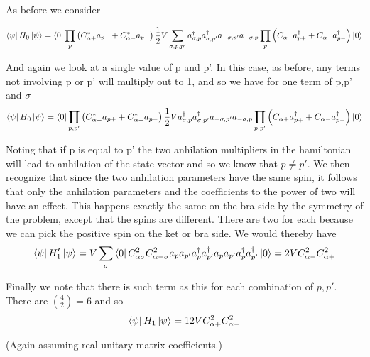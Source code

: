 \documentclass[11pt]{article} %
\begin{document}
As before we consider

\begin{equation} \bra{\psi} H_0 \ket{\psi}=\bra{0}\prod_p \left(C_{\alpha+}^*a_{p+}+C_{\alpha -}^*a_{p -} \right)\frac{1}{2}V \sum_{\sigma,p,p'} a_{\sigma,p}^\dagger a_{\sigma,p'}^\dagger a_{-\sigma,p'}a_{-\sigma,p}\prod_p \left(C_{\alpha+}a_{p+}^\dagger+C_{\alpha -}a_{p -}^\dagger \right) \ket{0}\end{equation}

And again we look at a single value of p and p'. In this case, as before, any terms not involving p or p' will multiply out to 1, and so we have for one term of p,p' and $\sigma$\\

\begin{equation}\bra{\psi} H_0 \ket{\psi}=\bra{0}\prod_{p,p'} \left(C_{\alpha+}^*a_{p+}+C_{\alpha -}^*a_{p -} \right)\frac{1}{2}V  a_{\sigma,p}^\dagger a_{\sigma,p'}^\dagger a_{-\sigma,p'}a_{-\sigma,p}\prod_{p,p'} \left(C_{\alpha+}a_{p+}^\dagger+C_{\alpha -}a_{p -}^\dagger \right) \ket{0}\end{equation}

Noting that if p is equal to p' the two anhilation multipliers in the hamiltonian will lead to anhilation of the state vector and so we know that $p\neq p'$. We then recognize that since the two anhilation parameters have the same spin, it follows that only the anhilation parameters and the  coefficients to the power of two will have an effect. This happens exactly the same on the bra side by the symmetry of the problem, except that the spins are different. There are two for each because we can pick the positive spin on the ket or bra side. We would thereby have\\

\begin{equation}
\bra{\psi}H_1'\ket{\psi}=V\sum_\sigma \bra{0} C_{\alpha \sigma}^2 C_{\alpha -\sigma}^2 a_{p}a_{p'}a_{p}^\dagger a_{p'}^\dagger a_{p}a_{p'}a_{p}^\dagger a_{p'}^\dagger \ket{0}=2V C_{\alpha -}^2C_{\alpha+}^2\end{equation}

Finally we note that there is such  term as this for each combination of $p,p'$. There are $\binom{4}{2}=6$ and so\\

\begin{equation}
\bra{\psi}H_1\ket{\psi}=12VC_{\alpha+}^2C_{\alpha-}^2 \end{equation}

(Again assuming real unitary matrix coefficients.)\\
\end{document}
